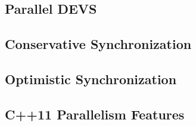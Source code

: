 \subsection{Parallel DEVS}
\subsection{Conservative Synchronization}
\subsection{Optimistic Synchronization}
\subsection{C++11 Parallelism Features}
